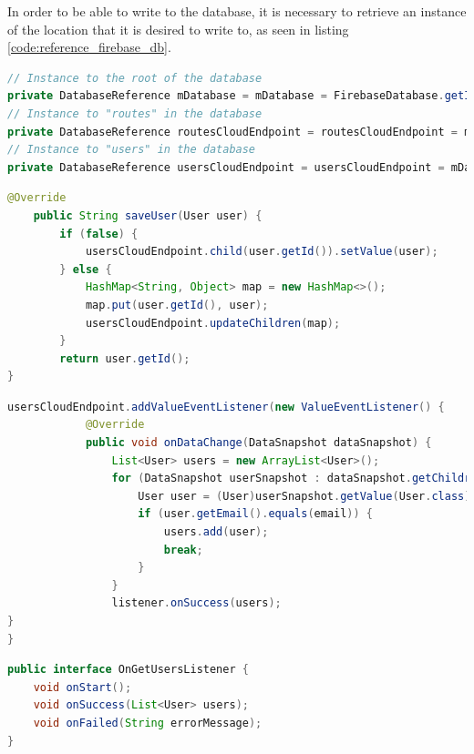 In order to be able to write to the database, it is necessary to retrieve an instance of the location that it is desired to write to, as seen in listing \ref{code:reference_firebase_db}. 



\begin{lstlisting}[frame=single, language=Java, label={code:reference_firebase_db}, caption={Reference an instance of user and routes in the database }]
// Instance to the root of the database
private DatabaseReference mDatabase = mDatabase = FirebaseDatabase.getInstance().getReference();
// Instance to "routes" in the database
private DatabaseReference routesCloudEndpoint = routesCloudEndpoint = mDatabase.child("routes");
// Instance to "users" in the database
private DatabaseReference usersCloudEndpoint = usersCloudEndpoint = mDatabase.child("users");
\end{lstlisting}



\begin{lstlisting}[frame=single, language=Java, label={code:write_to_firebase_db}, caption={Write to database}]
@Override
    public String saveUser(User user) {
        if (false) {
            usersCloudEndpoint.child(user.getId()).setValue(user);
        } else {
            HashMap<String, Object> map = new HashMap<>();
            map.put(user.getId(), user);
            usersCloudEndpoint.updateChildren(map);
        }
        return user.getId();
}
\end{lstlisting}

\begin{lstlisting}[frame=single, language=Java, label={code:read_from_firebase_db}, caption={Read from database}]
usersCloudEndpoint.addValueEventListener(new ValueEventListener() {
            @Override
            public void onDataChange(DataSnapshot dataSnapshot) {
                List<User> users = new ArrayList<User>();
                for (DataSnapshot userSnapshot : dataSnapshot.getChildren()) {
                    User user = (User)userSnapshot.getValue(User.class);
                    if (user.getEmail().equals(email)) {
                        users.add(user);
                        break;
                    }
                }
                listener.onSuccess(users);
}
}
\end{lstlisting}

\begin{lstlisting}[frame=single, language=Java, label={code:OnGetUserListener}, caption={Read from database}]
public interface OnGetUsersListener {
    void onStart();
    void onSuccess(List<User> users);
    void onFailed(String errorMessage);
}
\end{lstlisting}






